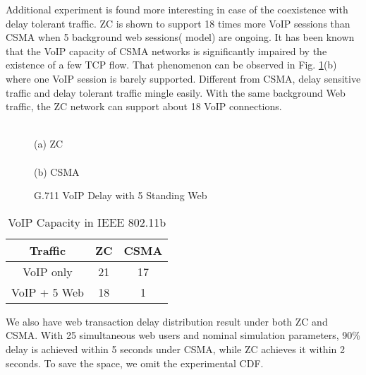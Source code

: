 \documentclass{acm_proc_article-sp}
\begin{document}
Additional experiment is found more interesting in case of the coexistence with delay tolerant traffic. ZC is shown to support 18 times more VoIP sessions than CSMA when 5 background web sessions(\cite{2004PACKMIME} model) are ongoing. It has been known that the VoIP capacity of CSMA networks is significantly impaired by the existence of a few TCP flow. That phenomenon can be observed in Fig. \ref{fig.voipwebdelay}(b) where one VoIP session is barely supported. Different from CSMA, delay sensitive traffic and delay tolerant traffic mingle easily. With the same background Web traffic, the ZC network can support about 18 VoIP connections.
\begin{figure}[ht]
    \begin{center}\small
     \\ (a) ZC \\
    \\ (b) CSMA
    \normalsize
    \caption{G.711 VoIP Delay with 5 Standing Web }\label{fig.voipwebdelay}
    \end{center}
\vspace{-0.2in}
\end{figure}
\begin{table}[ht]
\small
    \centering \caption{VoIP Capacity in IEEE 802.11b}
        \begin{tabular}{|c|c|c|}
        \hline
        {\bf{Traffic}}&{\bf{ZC}}&{\bf{CSMA}}\\
        \hline
        {VoIP only}&{21}&{17}\\
        {VoIP + 5 Web}&{18}&{1}\\
        \hline
        \end{tabular}
      \label{table.voipcapacity}
\end{table}
We also have web transaction delay distribution result under both ZC and CSMA. With 25 simultaneous web users and nominal simulation parameters, 90\% delay is achieved within 5 seconds under CSMA, while ZC achieves it within 2 seconds. To save the space, we omit the experimental CDF.
\end{document}
